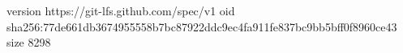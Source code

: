 version https://git-lfs.github.com/spec/v1
oid sha256:77de661db3674955558b7bc87922ddc9ec4fa911fe837bc9bb5bff0f8960ce43
size 8298
